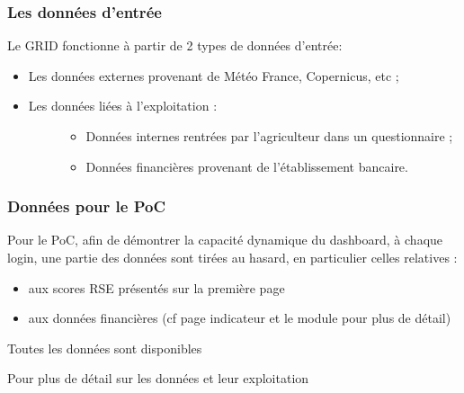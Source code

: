 \documentclass[letterpaper,10pt,french]{sphinxmanual}
\begin{document}
\subsubsection{Les données d’entrée}
\label{\detokenize{intro:les-donnees-d-entree}}
\sphinxAtStartPar
Le GRID fonctionne à partir de 2 types de données d’entrée:
\begin{itemize}
\item {} 
\sphinxAtStartPar
Les données externes provenant de Météo France, Copernicus, etc ;

\item {} \begin{description}
\item[{Les données liées à l’exploitation :}] \leavevmode\begin{itemize}
\item {} 
\sphinxAtStartPar
Données internes rentrées par l’agriculteur dans un questionnaire ;

\item {} 
\sphinxAtStartPar
Données financières provenant de l’établissement bancaire.

\end{itemize}

\end{description}

\end{itemize}


\subsubsection{Données pour le PoC}
\label{\detokenize{intro:donnees-pour-le-poc}}
\sphinxAtStartPar
Pour le PoC, afin de démontrer la capacité dynamique du dashboard, à chaque login, une partie des données sont tirées au hasard, en particulier celles relatives :
\begin{itemize}
\item {} 
\sphinxAtStartPar
aux scores RSE présentés sur la première page

\item {} 
\sphinxAtStartPar
aux données financières (cf page indicateur et le module  pour plus de détail)

\end{itemize}

\sphinxAtStartPar
Toutes les données sont disponibles 

\sphinxAtStartPar
Pour plus de détail sur les données et leur exploitation {\hyperref[\detokenize{indicateurs:indic}]{}}
\end{document}
